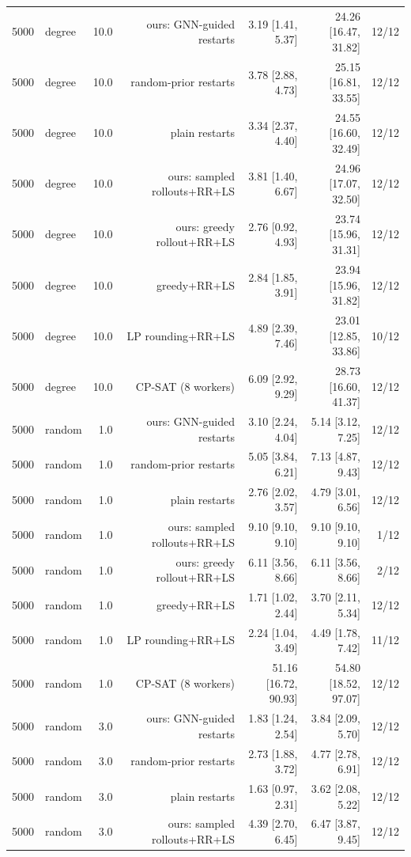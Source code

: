 \begin{table}[t]
\begin{tabular}{llrrrrr}
5000 & degree & 10.0 & ours: GNN-guided restarts & 3.19 [1.41, 5.37] & 24.26 [16.47, 31.82] & 12/12 \\
5000 & degree & 10.0 & random-prior restarts & 3.78 [2.88, 4.73] & 25.15 [16.81, 33.55] & 12/12 \\
5000 & degree & 10.0 & plain restarts & 3.34 [2.37, 4.40] & 24.55 [16.60, 32.49] & 12/12 \\
5000 & degree & 10.0 & ours: sampled rollouts+RR+LS & 3.81 [1.40, 6.67] & 24.96 [17.07, 32.50] & 12/12 \\
5000 & degree & 10.0 & ours: greedy rollout+RR+LS & 2.76 [0.92, 4.93] & 23.74 [15.96, 31.31] & 12/12 \\
5000 & degree & 10.0 & greedy+RR+LS & 2.84 [1.85, 3.91] & 23.94 [15.96, 31.82] & 12/12 \\
5000 & degree & 10.0 & LP rounding+RR+LS & 4.89 [2.39, 7.46] & 23.01 [12.85, 33.86] & 10/12 \\
5000 & degree & 10.0 & CP-SAT (8 workers) & 6.09 [2.92, 9.29] & 28.73 [16.60, 41.37] & 12/12 \\
5000 & random & 1.0 & ours: GNN-guided restarts & 3.10 [2.24, 4.04] & 5.14 [3.12, 7.25] & 12/12 \\
5000 & random & 1.0 & random-prior restarts & 5.05 [3.84, 6.21] & 7.13 [4.87, 9.43] & 12/12 \\
5000 & random & 1.0 & plain restarts & 2.76 [2.02, 3.57] & 4.79 [3.01, 6.56] & 12/12 \\
5000 & random & 1.0 & ours: sampled rollouts+RR+LS & 9.10 [9.10, 9.10] & 9.10 [9.10, 9.10] & 1/12 \\
5000 & random & 1.0 & ours: greedy rollout+RR+LS & 6.11 [3.56, 8.66] & 6.11 [3.56, 8.66] & 2/12 \\
5000 & random & 1.0 & greedy+RR+LS & 1.71 [1.02, 2.44] & 3.70 [2.11, 5.34] & 12/12 \\
5000 & random & 1.0 & LP rounding+RR+LS & 2.24 [1.04, 3.49] & 4.49 [1.78, 7.42] & 11/12 \\
5000 & random & 1.0 & CP-SAT (8 workers) & 51.16 [16.72, 90.93] & 54.80 [18.52, 97.07] & 12/12 \\
5000 & random & 3.0 & ours: GNN-guided restarts & 1.83 [1.24, 2.54] & 3.84 [2.09, 5.70] & 12/12 \\
5000 & random & 3.0 & random-prior restarts & 2.73 [1.88, 3.72] & 4.77 [2.78, 6.91] & 12/12 \\
5000 & random & 3.0 & plain restarts & 1.63 [0.97, 2.31] & 3.62 [2.08, 5.22] & 12/12 \\
5000 & random & 3.0 & ours: sampled rollouts+RR+LS & 4.39 [2.70, 6.45] & 6.47 [3.87, 9.45] & 12/12 \\

\end{tabular}
\end{table}
